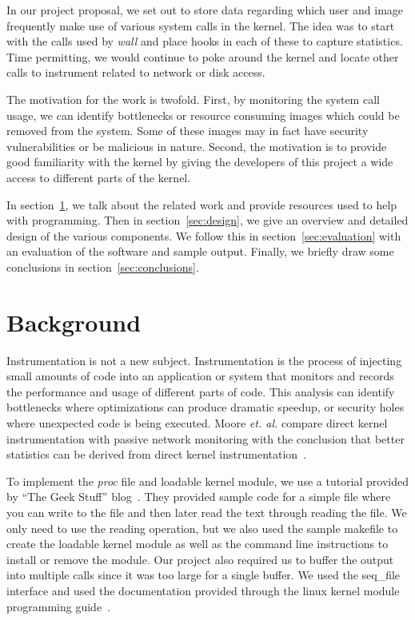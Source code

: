 \documentclass[conference]{IEEEtran}
\begin{document}
In our project proposal, we set out to store data regarding which user and image frequently make use of various system calls in the kernel.
The idea was to start with the calls used by \textit{wall} and place hooks in each of these to capture statistics.
Time permitting, we would continue to poke around the kernel and locate other calls to instrument related to network or disk access.

The motivation for the work is twofold.
First, by monitoring the system call usage, we can identify bottlenecks or resource consuming images which could be removed from the system.
Some of these images may in fact have security vulnerabilities or be malicious in nature.
Second, the motivation is to provide good familiarity with the kernel by giving the developers of this project a wide access to different parts of the kernel.

In section~\ref{sec:background}, we talk about the related work and provide resources used to help with programming.
Then in section~\ref{sec:design}, we give an overview and detailed design of the various components.
We follow this in section~\ref{sec:evaluation} with an evaluation of the software and sample output.
Finally, we briefly draw some conclusions in section~\ref{sec:conclusions}.

\section{Background}
\label{sec:background}
Instrumentation is not a new subject.
Instrumentation is the process of injecting small amounts of code into an application or system that monitors and records the performance and usage of different parts of code.
This analysis can identify bottlenecks where optimizations can produce dramatic speedup, or security holes where unexpected code is being executed.
Moore \textit{et. al.} compare direct kernel instrumentation with passive network monitoring with the conclusion that better statistics can be derived from direct kernel instrumentation~\cite{cit:1}.

To implement the \textit{proc} file and loadable kernel module, we use a tutorial provided by ``The Geek Stuff'' blog~\cite{cit:2}.
They provided sample code for a simple file where you can write to the file and then later read the text through reading the file.
We only need to use the reading operation, but we also used the sample makefile to create the loadable kernel module as well as the command line instructions to install or remove the module.
Our project also required us to buffer the output into multiple calls since it was too large for a single buffer.
We used the seq\_file interface and used the documentation provided through the linux kernel module programming guide~\cite{cit:3}.
\end{document}
